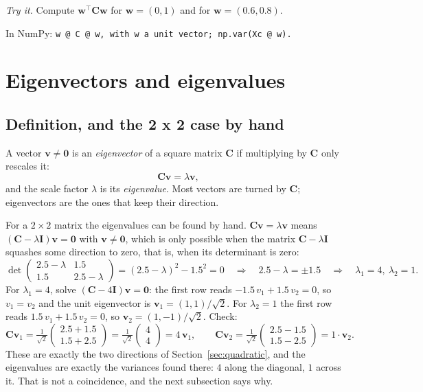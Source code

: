 \documentclass[11pt]{article}
\newcommand{\vw}{\bm{w}}
\newcommand{\vv}{\bm{v}}
\newcommand{\mC}{\bm{C}}
\newcommand{\mI}{\bm{I}}
\newcommand{\np}[1]{{\small\color{lightgray}In NumPy: \texttt{#1}}\par}
\begin{document}
\textit{Try it.} Compute $\vw^{\top}\mC\vw$ for $\vw = (0, 1)$ and for $\vw = (0.6, 0.8)$.

\np{w @ C @ w, with w a unit vector; np.var(Xc @ w).}

\section{Eigenvectors and eigenvalues}

\subsection{Definition, and the 2 x 2 case by hand}

A vector $\vv \neq \bm{0}$ is an \emph{eigenvector} of a square matrix $\mC$ if
multiplying by $\mC$ only rescales it:
\[
\mC\vv = \lambda\vv ,
\]
and the scale factor $\lambda$ is its \emph{eigenvalue}. Most vectors are turned by $\mC$;
eigenvectors are the ones that keep their direction.

For a $2\times2$ matrix the eigenvalues can be found by hand. $\mC\vv = \lambda\vv$ means
$(\mC - \lambda\mI)\vv = \bm{0}$ with $\vv \neq \bm 0$, which is only possible when the
matrix $\mC - \lambda\mI$ squashes some direction to zero, that is, when its determinant is
zero:
\[
\det\begin{pmatrix} 2.5-\lambda & 1.5 \\ 1.5 & 2.5-\lambda \end{pmatrix}
= (2.5-\lambda)^2 - 1.5^2 = 0
\quad\Longrightarrow\quad 2.5 - \lambda = \pm 1.5
\quad\Longrightarrow\quad \lambda_1 = 4,\ \lambda_2 = 1 .
\]
For $\lambda_1 = 4$, solve $(\mC - 4\mI)\vv = \bm 0$: the first row reads
$-1.5\,v_1 + 1.5\,v_2 = 0$, so $v_1 = v_2$ and the unit eigenvector is
$\vv_1 = (1, 1)/\sqrt{2}$. For $\lambda_2 = 1$ the first row reads
$1.5\,v_1 + 1.5\,v_2 = 0$, so $\vv_2 = (1, -1)/\sqrt{2}$. Check:
\[
\mC\vv_1 = \tfrac{1}{\sqrt2}\begin{pmatrix} 2.5 + 1.5 \\ 1.5 + 2.5\end{pmatrix}
= \tfrac{1}{\sqrt2}\begin{pmatrix}4\\4\end{pmatrix} = 4\,\vv_1, \qquad
\mC\vv_2 = \tfrac{1}{\sqrt2}\begin{pmatrix} 2.5 - 1.5 \\ 1.5 - 2.5\end{pmatrix} = 1\cdot\vv_2 .
\]
These are exactly the two directions of Section~\ref{sec:quadratic}, and the eigenvalues
are exactly the variances found there: $4$ along the diagonal, $1$ across it. That is not a
coincidence, and the next subsection says why.
\end{document}
